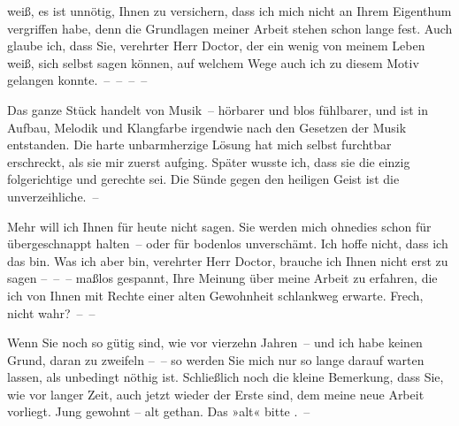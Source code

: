                weiß, es ist unnötig, Ihnen zu versichern, dass ich mich nicht an Ihrem Eigenthum
               vergriffen habe, denn die Grundlagen meiner Arbeit stehen schon lange fest. Auch glaube ich, dass Sie,
               verehrter Herr Doctor, der ein wenig von meinem Leben weiß, sich selbst sagen können,
               auf welchem Wege auch ich zu diesem Motiv gelangen konnte. – – – –\pend
           
\pstart
           Das ganze Stück handelt von
               Musik – hörbarer und blos fühlbarer, und ist in Aufbau, Melodik und Klangfarbe
               irgendwie nach den Gesetzen der Musik entstanden. Die harte unbarmherzige Lösung hat
               mich selbst furchtbar erschreckt, als sie mir zuerst aufging. Später wusste ich, dass
               sie die einzig folgerichtige und gerechte sei. Die Sünde gegen den heiligen Geist ist
               die unverzeihliche. –\pend
           
\pstart
           Mehr will ich Ihnen für heute nicht sagen. Sie werden mich ohnedies schon für
               übergeschnappt halten – oder für bodenlos unverschämt. Ich hoffe nicht, dass ich das
               bin. {\pb}Was ich aber bin, verehrter Herr Doctor, brauche
               ich Ihnen nicht erst zu sagen – – – maßlos gespannt, Ihre Meinung über meine Arbeit zu erfahren, die ich
               von Ihnen mit Rechte einer alten Gewohnheit schlankweg erwarte. Frech, nicht
               wahr? – –\pend
           
\pstart
           Wenn Sie noch so gütig sind, wie vor vierzehn Jahren – und ich habe keinen Grund,
               daran zu zweifeln – – so werden Sie mich nur so lange darauf warten lassen, als
               unbedingt nöthig ist. Schließlich noch die kleine Bemerkung, dass Sie, wie vor langer
               Zeit, auch jetzt wieder der Erste sind, dem meine neue Arbeit vorliegt. Jung gewohnt – alt
               gethan. Das »alt« bitte \label{K_L03730-5v}\label{K_L03730-5}. –\pend
           
